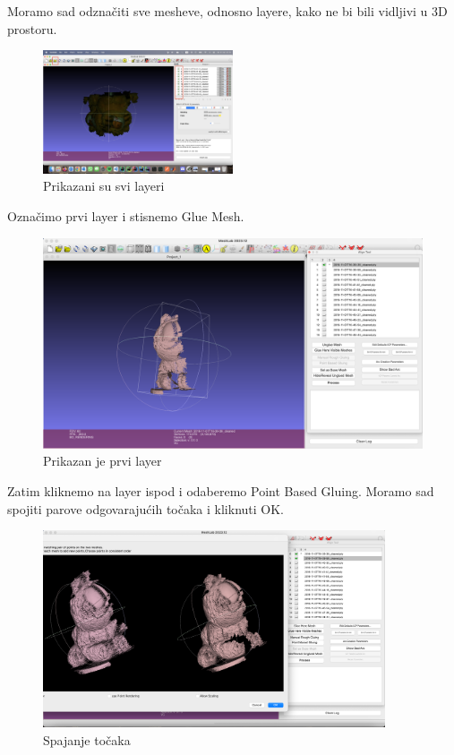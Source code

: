 \documentclass[12pt]{article} %
\begin{document}
		Moramo sad odznačiti sve mesheve, odnosno layere, kako ne bi bili vidljivi u 3D prostoru.
		\begin{figure}[H]
			\centering
			\includegraphics[width=0.5\textwidth]{screenshots/3.png}
			\caption{Prikazani su svi layeri}
			\label{fig:yourlabel}
		\end{figure}
		
		\pagebreak
		Označimo prvi layer i stisnemo Glue Mesh. 
		\begin{figure}[H]
			\centering
			\includegraphics[width=1\textwidth]{screenshots/4.png}
			\caption{Prikazan je prvi layer}
			\label{fig:yourlabel}
		\end{figure}
		Zatim kliknemo na layer ispod i odaberemo Point Based Gluing. Moramo sad spojiti parove odgovarajućih točaka i kliknuti OK.		\begin{figure}[H]
			\centering
			\includegraphics[width=0.9\textwidth]{screenshots/5.png}
			\caption{Spajanje točaka}
			\label{fig:yourlabel}
		\end{figure}
		
\end{document}
